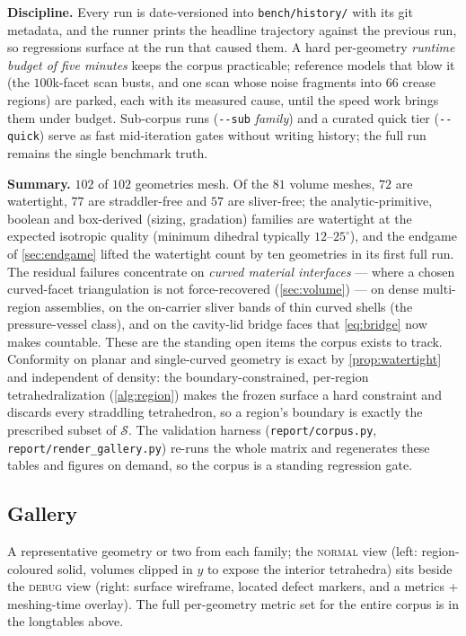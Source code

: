 \documentclass[11pt,a4paper]{article}
\numberwithin{equation}{section}
\DeclareRobustCommand{\code}[1]{\texttt{#1}}
\begin{document}
\medskip\noindent
\textbf{Discipline.} Every run is date-versioned into \code{bench/history/}
with its git metadata, and the runner prints the headline trajectory against
the previous run, so regressions surface at the run that caused them. A hard
per-geometry \emph{runtime budget of five minutes} keeps the corpus
practicable; reference models that blow it (the $100$k-facet scan busts, and
one scan whose noise fragments into $66$ crease regions) are parked, each with
its measured cause, until the speed work brings them under budget.
Sub-corpus runs (\code{-{}-sub} \emph{family}) and a curated quick tier
(\code{-{}-quick}) serve as fast mid-iteration gates without writing history;
the full run remains the single benchmark truth.

\medskip\noindent
\textbf{Summary.} $102$ of $102$ geometries mesh. Of the $81$ volume meshes,
$72$ are watertight, $77$ are straddler-free and $57$ are sliver-free; the
analytic-primitive, boolean and box-derived (sizing, gradation) families are
watertight at the expected isotropic quality (minimum dihedral typically
$12$--$25^\circ$), and the endgame of \cref{sec:endgame} lifted the
watertight count by ten geometries in its first full run. The residual
failures concentrate on \emph{curved material interfaces} --- where a chosen
curved-facet triangulation is not force-recovered (\cref{sec:volume}) --- on
dense multi-region assemblies, on the on-carrier sliver bands of thin curved
shells (the pressure-vessel class), and on the cavity-lid bridge faces that
\eqref{eq:bridge} now makes countable. These are the standing open items the
corpus exists to track. Conformity on planar and single-curved geometry is
exact by \cref{prop:watertight} and independent of density: the
boundary-constrained, per-region tetrahedralization (\cref{alg:region}) makes
the frozen surface a hard constraint and discards every straddling
tetrahedron, so a region's boundary is exactly the prescribed subset of
$\mathcal{S}$. The validation harness (\code{report/corpus.py},
\code{report/render\_gallery.py}) re-runs the whole matrix and regenerates
these tables and figures on demand, so the corpus is a standing regression
gate.



\subsection{Gallery}
\label{sec:gallery}
A representative geometry or two from each family; the \textsc{normal} view (left:
region-coloured solid, volumes clipped in $y$ to expose the interior tetrahedra)
sits beside the \textsc{debug} view (right: surface wireframe, located defect
markers, and a metrics + meshing-time overlay). The full per-geometry metric set
for the entire corpus is in the longtables above.


\printbibliography[title={References}, heading=bibintoc]
\end{document}
